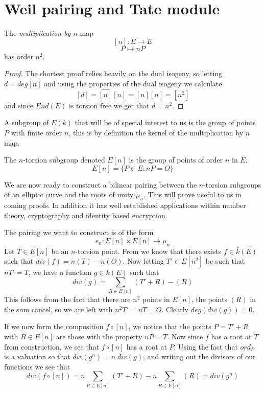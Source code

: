 \section{Weil pairing and Tate module}

\begin{prop}
 The \emph{multiplication by $n$} map
$$ [n] : E \rightarrow E $$
$$ P \mapsto nP $$
has order $n^2$.
\end{prop}
\begin{proof}
The shortest proof relies heavily on the dual isogeny, so letting $d = deg [n]$ and using the properties of 
the dual isogeny we calculate
$$ [d] = \widehat{[n]}[n] = [n][n] = [n^2] $$
and since $End(E)$ is torsion free \cite{AEC} we get that $d = n^2$.
\end{proof}

A subgroup of $E(k)$ that will be of special interest to us is the group of points $P$
with finite order $n$, this is by definition the kernel of the multiplication by $n$ map.
\begin{mydef}
 The $n$-torsion subgroup denoted $E[n]$ is the group of points of order $n$ in $E$.
$$ E[n] = \{ P\in E : nP = O \} $$
\end{mydef}

We are now ready to construct a bilinear pairing between the $n$-torsion subgroups of
an elliptic curve and the roots of unity $\mu_n$. This will prove useful to us in coming
proofs. In addition it has well established applications within number theory, cryptography
and identity based encryption.

The pairing we want to construct is of the form
$$ e_n : E[n] \times E[n] \rightarrow \mu_n $$
Let $T\in E[n]$ be an $n$-torsion point. From \cite{Lawrence} we know that there exists
$f \in \bar{k}(E)$ such that $div(f) = n(T) - n(O)$. Now letting $T' \in E[n^2]$ be such
that $nT' = T$, we have a function $g \in \bar{k}(E)$ such that
$$ div(g) = \sum_{R\in E[n]} (T'+R)-(R) $$
This follows from the fact that there are $n^2$ points in $E[n]$, the points $(R)$ in the
sum cancel, so we are left with $n^2 T' = nT = O$. Clearly $deg(div(g)) = 0$.

If we now form the composition $f \circ [n]$, we notice that the points $P = T' + R$ with
$R\in E[n]$ are those with the property $nP = T$. Now since $f$ has a root at $T$ from
construction, we see that $f \circ [n]$ has a root at $P$. Using the fact that $ord_P$ is a valuation
so that $div(g^n) = n\;div(g)$, and writing out the divisors of our functions we see that
$$ div(f \circ [n]) = n\sum_{R\in E[n]} (T'+R) - n\sum_{R\in E[n]} (R) = div(g^n) $$

